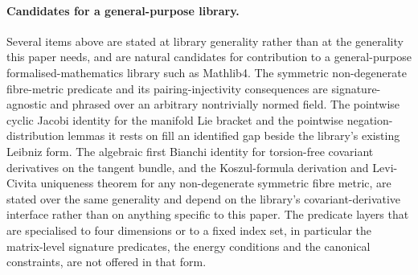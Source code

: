 \documentclass[aps,prd,nofootinbib,superscriptaddress,12pt]{revtex4-2}
\begin{document}
\paragraph{Candidates for a general-purpose library.}
Several items above are stated at library generality rather than at the
generality this paper needs, and are natural candidates for contribution to a
general-purpose formalised-mathematics library such as Mathlib4. The
symmetric non-degenerate fibre-metric predicate and its pairing-injectivity
consequences are signature-agnostic and phrased over an arbitrary nontrivially
normed field. The pointwise cyclic Jacobi identity for the manifold Lie bracket
and the pointwise negation-distribution lemmas it rests on fill an identified gap
beside the library's existing Leibniz form. The algebraic first Bianchi identity
for torsion-free covariant derivatives on the tangent bundle, and the
Koszul-formula derivation and Levi-Civita uniqueness theorem for any
non-degenerate symmetric fibre metric, are stated over the same generality and
depend on the library's covariant-derivative interface rather than on anything
specific to this paper. The predicate layers that are specialised to four
dimensions or to a fixed index set, in particular the matrix-level signature
predicates, the energy conditions and the canonical constraints, are not offered
in that form.
\end{document}
